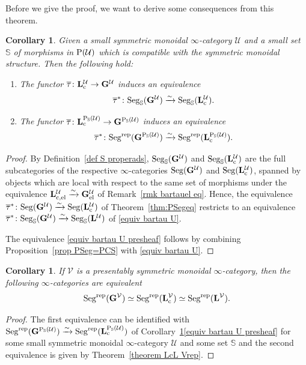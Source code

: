 \documentclass{amsart}
\numberwithin{theorem}{subsection}
\newtheorem{corollary}[theorem]{Corollary}
\newtheorem{cor}[theorem]{Corollary}
\theoremstyle{definition}
\providecommand{\xel}{\mathrm{el}}
\newcommand{\xU}{\mathcal{U}}
\newcommand{\xV}{\mathcal{V}}
\newcommand{\Pre}{\name{P}}
\newcommand{\PSU}{\Pre_{\mathbb{S}}(\xU)}
\newcommand{\icat}{$\infty$-category}
\newcommand{\isoto}{\xrightarrow{\sim}}
\newcommand{\name}[1]{\ensuremath{\text{\textup{#1}}}}
\newcommand{\levelg}{\mathbf{L}}
\newcommand{\levelV}{\levelg^\xV}
\newcommand{\levelU}{\levelg^\xU}
\newcommand{\levelgconn}{\levelg_{\name{c}}}
\newcommand{\levelcPSU}{\levelgconn^{\PSU}}
\newcommand{\levelcV}{\levelgconn^{\xV}}
\newcommand{\levelcU}{\levelgconn^{\xU}}
\newcommand{\bbY}{\mathbf{G}}
\newcommand{\bbYV}{\bbY^{\xV}}
\newcommand{\bbYU}{\bbY^\xU}
\newcommand{\bbYPSU}{\bbY^{\PSU}}
\newcommand{\bartau}{\overline{\tau}}
\newcommand{\Seg}{\name{Seg}}
\newcommand{\Segrep}{\Seg^{\name{rep}}}
\newcommand{\SegS}{\Seg_{\mathbb{S}}}
\begin{document}
Before we give the proof, we want to derive some consequences from this theorem.
\begin{cor}\label{cor:PSSegeq}
 Given a small symmetric monoidal \icat{} $\xU$ and a small set
  $\mathbb{S}$ of morphisms in $\Pre(\xU)$ which is
  compatible with the symmetric monoidal structure.
Then the following hold:
  \begin{enumerate}[label=(\roman*), ref={\roman*}]
  \item The functor $\bartau \colon \levelcU \to \bbYU$ induces an equivalence
    \[\bartau^*\colon  \SegS(\bbYU) \isoto \SegS(\levelcU).\] \label{equiv bartau U}
  \item The functor $\bartau \colon
    \levelgconn^{\PSU} \to
    \bbY^{\PSU}$ induces an equivalence
    \[ \bartau^*\colon \Segrep(\bbYPSU) \isoto
    \Segrep(\levelcPSU).\] \label{equiv bartau U presheaf}
  \end{enumerate}
\end{cor}

\begin{proof}
By Definition~\ref{def S properads}, $\SegS(\bbYU)$ and $\SegS(\levelcU)$ are the full subcategories of the respective $\infty$-categories $\Seg(\bbYU)$ and $\Seg(\levelcU)$, spanned by objects which are local with respect to the same set of morphisms under the equivalence 
$\levelg_{\name{c,el}}^\xU \isoto \bbY^\xU_\xel$ 
of Remark~\ref{rmk bartauel eq}.
Hence, the equivalence $\bartau^{*} \colon \Seg(\bbYU) \isoto \Seg(\levelcU)$ of Theorem~\ref{thm:PSegeq} restricts to an equivalence $\bartau^*\colon  \SegS(\bbYU) \isoto \SegS(\levelU)$ of \eqref{equiv bartau U}.

The equivalence \eqref{equiv bartau U presheaf} follows by combining Proposition~\ref{prop PSeg=PCS} with \eqref{equiv bartau U}.
\end{proof}

\begin{corollary}\label{cor equ enr properads}
If $\xV$ is a presentably symmetric monoidal $\infty$-category, then
the following $\infty$-categories are equivalent 
$$\Segrep(\bbYV) \simeq \Segrep(\levelcV)\simeq \Segrep(\levelV).$$
\end{corollary}
\begin{proof}
	The first equivalence can be identified with $\Segrep(\bbYPSU) \isoto
	\Segrep(\levelcPSU)$ of Corollary~\ref{cor:PSSegeq}\eqref{equiv bartau U presheaf} for some small symmetric monoidal $\infty$-category $\xU$ and some set $\mathbb{S}$ and the second equivalence is given by Theorem~\ref{theorem LcL Vrep}. 
\end{proof}
\end{document}
